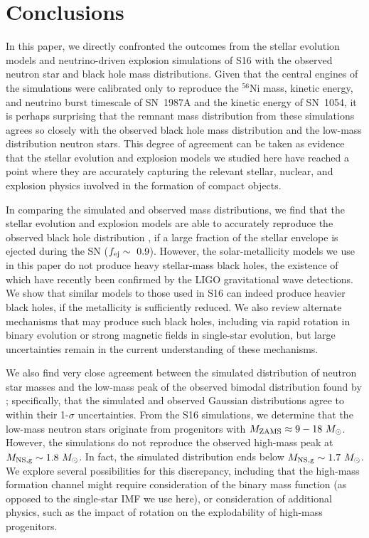 \documentclass[]{emulateapj}
\newcommand{\Ms}{M_{\odot}}
\newcommand{\Mz}{M_{\rm ZAMS}}
\newcommand{\Mng}{M_{\rm NS, g}}
\newcommand{\fe}{f_{\rm ej}}
\begin{document}
\section{Conclusions}
In this paper, we directly confronted the outcomes from the stellar evolution models and neutrino-driven explosion simulations of S16 with the observed neutron star and black hole mass distributions. Given that the central engines of the simulations were calibrated only to reproduce the $^{56}$Ni mass, kinetic energy, and neutrino burst timescale of SN~1987A and the kinetic energy of SN~1054, it is perhaps surprising that the remnant mass distribution from these simulations agrees so closely with the observed black hole mass distribution and the low-mass distribution neutron stars. This degree of agreement can be taken as evidence that the stellar evolution and explosion models we studied here have reached a point where they are accurately capturing the relevant stellar, nuclear, and explosion physics involved in the formation of compact objects.

In comparing the simulated and observed mass distributions, we find that the stellar evolution and explosion models are able to accurately reproduce the observed black hole distribution \citep{Ozel2010b, Farr2011}, if a large fraction of the stellar envelope is ejected during the SN ($\fe \sim~0.9$). However, the solar-metallicity models we use in this paper do not produce heavy stellar-mass black holes, the existence of which have recently been confirmed by the LIGO gravitational wave detections. We show that similar models to those used in S16 can indeed produce heavier black holes, if the metallicity is sufficiently reduced. We also review alternate mechanisms that may produce such black holes, including via rapid rotation in binary evolution or strong magnetic fields in single-star evolution, but large uncertainties remain in the current understanding of these mechanisms.

We also find very close agreement between the simulated distribution of neutron star masses and the low-mass peak of the observed bimodal distribution found by \citet{Antoniadis2016}; specifically, that the simulated and observed Gaussian distributions agree to within their 1-$\sigma$ uncertainties. From the S16 simulations, we determine that the low-mass neutron stars originate from progenitors with $\Mz \approx9-18~\Ms$. However, the simulations do not reproduce the observed high-mass peak at $\Mng\sim1.8~\Ms$. In fact, the simulated distribution ends below $\Mng\sim1.7~\Ms$. We explore several possibilities for this discrepancy, including that the high-mass formation channel might require consideration of the binary mass function (as opposed to the single-star IMF we use here), or consideration of additional physics, such as the impact of rotation on the explodability of high-mass progenitors.
\end{document}
